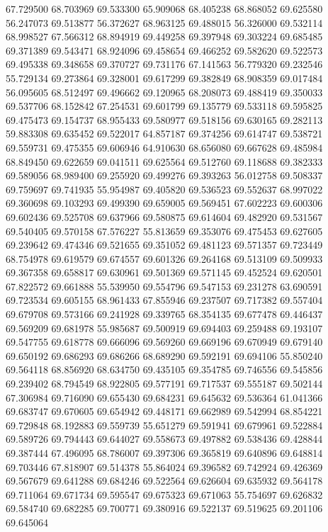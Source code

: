 67.729500
68.703969
69.533300
65.909068
68.405238
68.868052
69.625580
56.247073
69.513877
56.372627
68.963125
69.488015
56.326000
69.532114
68.998527
67.566312
68.894919
69.449258
69.397948
69.303224
69.685485
69.371389
69.543471
68.924096
69.458654
69.466252
69.582620
69.522573
69.495338
69.348658
69.370727
69.731176
67.141563
56.779320
69.232546
55.729134
69.273864
69.328001
69.617299
69.382849
68.908359
69.017484
56.095605
68.512497
69.496662
69.120965
68.208073
69.488419
69.350033
69.537706
68.152842
67.254531
69.601799
69.135779
69.533118
69.595825
69.475473
69.154737
68.955433
69.580977
69.518156
69.630165
69.282113
59.883308
69.635452
69.522017
64.857187
69.374256
69.614747
69.538721
69.559731
69.475355
69.606946
64.910630
68.656080
69.667628
69.485984
68.849450
69.622659
69.041511
69.625564
69.512760
69.118688
69.382333
69.589056
68.989400
69.255920
69.499276
69.393263
56.012758
69.508337
69.759697
69.741935
55.954987
69.405820
69.536523
69.552637
68.997022
69.360698
69.103293
69.499390
69.659005
69.569451
67.602223
69.600306
69.602436
69.525708
69.637966
69.580875
69.614604
69.482920
69.531567
69.540405
69.570158
67.576227
55.813659
69.353076
69.475453
69.627605
69.239642
69.474346
69.521655
69.351052
69.481123
69.571357
69.723449
68.754978
69.619579
69.674557
69.601326
69.264168
69.513109
69.509933
69.367358
69.658817
69.630961
69.501369
69.571145
69.452524
69.620501
67.822572
69.661888
55.539950
69.554796
69.547153
69.231278
63.690591
69.723534
69.605155
68.961433
67.855946
69.237507
69.717382
69.557404
69.679708
69.573166
69.241928
69.339765
68.354135
69.677478
69.446437
69.569209
69.681978
55.985687
69.500919
69.694403
69.259488
69.193107
69.547755
69.618778
69.666096
69.569260
69.669196
69.670949
69.679140
69.650192
69.686293
69.686266
68.689290
69.592191
69.694106
55.850240
69.564118
68.856920
68.634750
69.435105
69.354785
69.746556
69.545856
69.239402
68.794549
68.922805
69.577191
69.717537
69.555187
69.502144
67.306984
69.716090
69.655430
69.684231
69.645632
69.536364
61.041366
69.683747
69.670605
69.654942
69.448171
69.662989
69.542994
68.854221
69.729848
68.192883
69.559739
55.651279
69.591941
69.679961
69.522884
69.589726
69.794443
69.644027
69.558673
69.497882
69.538436
69.428844
69.387444
67.496095
68.786007
69.397306
69.365819
69.640896
69.648814
69.703446
67.818907
69.514378
55.864024
69.396582
69.742924
69.426369
69.567679
69.641288
69.684246
69.522564
69.626604
69.635932
69.564178
69.711064
69.671734
69.595547
69.675323
69.671063
55.754697
69.626832
69.584740
69.682285
69.700771
69.380916
69.522137
69.519625
69.201106
69.645064
